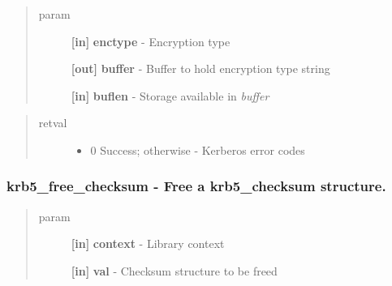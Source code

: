 \documentclass[letterpaper,10pt,english]{sphinxmanual}
\begin{document}
\begin{quote}\begin{description}
\item[{param}] \leavevmode
\textbf{{[}in{]}} \textbf{enctype} - Encryption type

\textbf{{[}out{]}} \textbf{buffer} - Buffer to hold encryption type string

\textbf{{[}in{]}} \textbf{buflen} - Storage available in \emph{buffer}

\end{description}\end{quote}
\begin{quote}\begin{description}
\item[{retval}] \leavevmode\begin{itemize}
\item {} 
0   Success; otherwise - Kerberos error codes

\end{itemize}

\end{description}\end{quote}


\subsubsection{krb5\_free\_checksum -  Free a krb5\_checksum structure.}
\label{appdev/refs/api/krb5_free_checksum:krb5-free-checksum-free-a-krb5-checksum-structure}\label{appdev/refs/api/krb5_free_checksum::doc}

\begin{fulllineitems}
\label{appdev/refs/api/krb5_free_checksum:krb5_free_checksum}
\end{fulllineitems}

\begin{quote}\begin{description}
\item[{param}] \leavevmode
\textbf{{[}in{]}} \textbf{context} - Library context

\textbf{{[}in{]}} \textbf{val} - Checksum structure to be freed

\end{description}\end{quote}
\end{document}
